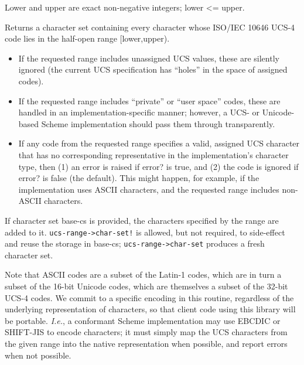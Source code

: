 \begin{entry}{%
  }

  Lower and upper are exact non-negative
  integers; lower <= upper.

  Returns a character set containing every character whose ISO/IEC
  10646 UCS-4 code lies in the half-open range {[}lower,upper).

\begin{itemize}
  \tightlist
\item If the requested range includes unassigned UCS values, these are
  silently ignored (the current UCS specification has ``holes'' in the
  space of assigned codes).
\item If the requested range includes ``private'' or ``user space''
  codes, these are handled in an implementation-specific manner;
  however, a UCS- or Unicode-based Scheme implementation should pass
  them through transparently.
\item If any code from the requested range specifies a valid, assigned
  UCS character that has no corresponding representative in the
  implementation's character type, then (1) an error is raised if
  error?  is true, and (2) the code is ignored if error? is false (the
  default).  This might happen, for example, if the implementation
  uses ASCII characters, and the requested range includes non-ASCII
  characters.
\end{itemize}

If character set base-cs is provided, the characters specified by the
range are added to it. \texttt{ucs-range->char-set!} is allowed, but
not required, to side-effect and reuse the storage in base-cs;
\texttt{ucs-range->char-set} produces a fresh character set.

Note that ASCII codes are a subset of the Latin-1 codes, which are in
turn a subset of the 16-bit Unicode codes, which are themselves a
subset of the 32-bit UCS-4 codes. We commit to a specific encoding in
this routine, regardless of the underlying representation of
characters, so that client code using this library will be
portable. \emph{I.e.}, a conformant Scheme implementation may use
EBCDIC or SHIFT-JIS to encode characters; it must simply map the UCS
characters from the given range into the native representation when
possible, and report errors when not possible.
\end{entry}

